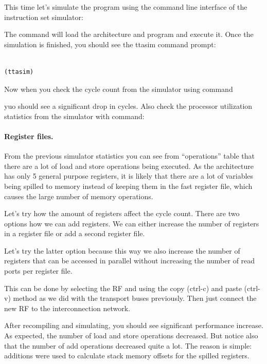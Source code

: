 \documentclass[a4paper,twoside]{tceusermanual}
\begin{document}
This time let's simulate the program using the command line interface of the
instruction set simulator:


The command will load the architecture and program and execute
it. Once the simulation is finished, you should see the ttasim command prompt:

\begin{verbatim}

(ttasim) 
\end{verbatim}

Now when you check the cycle count from the simulator using command


yuo should see a significant drop in cycles.
Also check the processor utilization statistics from the simulator
with command:


\paragraph{Register files.}

From the previous simulator statistics you can see from ``operations'' table
that there are a lot of load and store operations being executed. As the
architecture has only 5 general purpose registers, it is likely that there
are a lot of variables being spilled to memory instead of keeping them in
the fast register file, which causes the large number of memory operations.

Let's try how the amount of registers affect the cycle count. There are two
options how we can add registers. We can either increase the number of
registers in a register file or add a second register file.

Let's try the latter option because this way we also increase the number of registers
that can be accessed in parallel without increasing the number of read ports per
register file.

This can be done by selecting the RF and using the copy (ctrl-c) and paste (ctrl-v) method as
we did with the transport buses previously. Then just connect the new RF to the interconnection
network.

After recompiling and simulating, you should see significant performance increase.
As expected, the number of load and store operations decreased. But notice also that the number
of add operations decreased quite a lot. The reason is simple: additions were used
to calculate stack memory offsets for the spilled registers.
\end{document}
